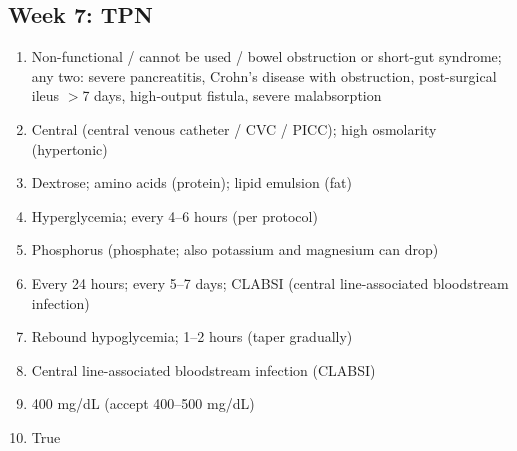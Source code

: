 \documentclass[11pt,letterpaper]{article}
\begin{document}
\begin{keybox}
\subsection*{Week 7: TPN}
\begin{enumerate}[leftmargin=1.5em,label=\textbf{\arabic*.},start=51]
  \item Non-functional / cannot be used / bowel obstruction or short-gut syndrome;
        any two: severe pancreatitis, Crohn's disease with obstruction, post-surgical
        ileus $>$7 days, high-output fistula, severe malabsorption
  \item Central (central venous catheter / CVC / PICC); high osmolarity (hypertonic)
  \item Dextrose; amino acids (protein); lipid emulsion (fat)
  \item Hyperglycemia; every 4--6 hours (per protocol)
  \item Phosphorus (phosphate; also potassium and magnesium can drop)
  \item Every 24 hours; every 5--7 days; CLABSI (central line-associated bloodstream
        infection)
  \item Rebound hypoglycemia; 1--2 hours (taper gradually)
  \item Central line-associated bloodstream infection (CLABSI)
  \item 400 mg/dL (accept 400--500 mg/dL)
  \item True
\end{enumerate}

\hrulefill

\end{keybox}
\end{document}
